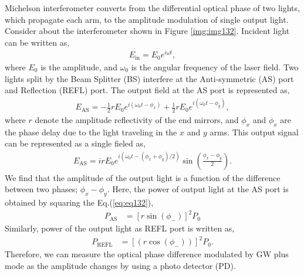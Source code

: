 Michelson interferometer converts from the differential optical phase of two lights, which propagate each arm, to the amplitude modulation of single output light. Consider about the interferometer shown in Figure  \ref{img:img132}. Incident light can be written as,
\begin{eqnarray}
  E_{\mathrm{in}} = E_{0} e^{i\omega{t}},
\end{eqnarray}
where $E_0$ is the amplitude, and $\omega_0$ is the angular frequency of the laser field. 
Two lights split by the Beam Splitter (BS) interfere at the Anti-symmetric (AS) port and Reflection (REFL) port. The output field at the AS port is represented as,
\begin{eqnarray}
  E_{\mathrm{AS}} = -\frac{1}{2}rE_{0} e^{i\left(\omega_{0} t-\phi_{x}\right)}+\frac{1}{2}r E_{0} e^{i\left(\omega_{0} t-\phi_{y}\right)},
\end{eqnarray}
where $r$ denote the amplitude reflectivity of the end mirrors, and $\phi_{x}$ and $\phi_{x}$ are the phase delay due to the light traveling in the $x$ and $y$ arms. This output signal can be represented as a single fieled as,
\begin{eqnarray}
E_{\mathrm{AS}} = i r E_{0} e^{i\left(\omega_{0} t-\left(\phi_{x}+\phi_{y}\right) / 2\right)} \sin \left(\frac{\phi_{x}-\phi_{y}}{2}\right). \label{eq:eq132}
\end{eqnarray} 
We find that the amplitude of the output light is a function of the difference between two phases; $\phi_{x}-\phi_{y}$. Here, the power of output light at the AS port is obtained by squaring the Eq.(\ref{eq:eq132}), 
\begin{eqnarray}
  P_{\mathrm{AS}} &=\left[r\sin({\phi_{-}})\right]^2P_0  \label{eq:eq133}
\end{eqnarray}
Similarly, power of the output light as REFL port is written as,
\begin{eqnarray}
  P_{\mathrm{REFL}} &=\left[(r\cos({\phi_{-}}))\right]^2P_0. \label{eq:eq134}
\end{eqnarray}
Therefore, we can measure the optical phase difference modulated by GW plus mode as the amplitude changes by using a photo detector (PD).


